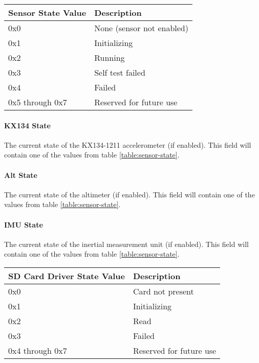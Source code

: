 \begin{table*}[htb]
    \centering
    \begin{tabular}{@{}ll@{}}
        \toprule
        Sensor State Value & Description               \\
        \midrule
        0x0                & None (sensor not enabled) \\
        0x1                & Initializing              \\
        0x2                & Running                   \\
        0x3                & Self test failed          \\
        0x4                & Failed                    \\
        0x5 through 0x7    & Reserved for future use   \\
        \bottomrule
    \end{tabular}
    \caption{Sensor States}
    \label{table:sensor-state}
\end{table*}

\paragraph{KX134 State}
The current state of the KX134-1211 accelerometer (if enabled). This field will contain one of the values from table
\ref{table:sensor-state}.

\paragraph{Alt State}
The current state of the altimeter (if enabled). This field will contain one of the values from table
\ref{table:sensor-state}.

\paragraph{IMU State}
The current state of the inertial measurement unit (if enabled). This field will contain one of the values from table
\ref{table:sensor-state}.

\begin{table*}[htb]
    \centering
    \begin{tabular}{@{}ll@{}}
        \toprule
        SD Card Driver State Value & Description             \\
        \midrule
        0x0                        & Card not present        \\
        0x1                        & Initializing            \\
        0x2                        & Read                    \\
        0x3                        & Failed                  \\
        0x4 through 0x7            & Reserved for future use \\
        \bottomrule
    \end{tabular}
    \caption{SD Card Driver States}
    \label{table:sd-state}
\end{table*}


